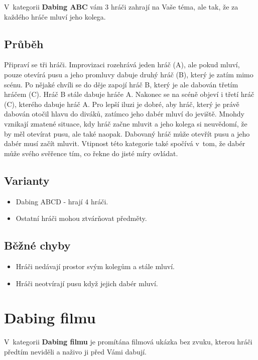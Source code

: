 V~kategorii \textbf{Dabing ABC} vám 3 hráči zahrají na Vaše téma, ale tak, že za každého hráče mluví jeho kolega. 
 
\subsection{Průběh} Připraví se tři hráči. Improvizaci rozehrává jeden hráč (A), ale pokud mluví, pouze otevírá pusu a jeho promluvy dabuje druhý hráč (B), který je zatím mimo scénu. Po nějaké chvíli se do děje zapojí hráč B, který je ale dabován třetím hráčem (C). Hráč B stále dabuje hráče A. Nakonec se na scéně objeví i třetí hráč (C), kterého dabuje hráč A. Pro lepší iluzi je dobré, aby hráč, který je právě dabován otočil hlavu do diváků, zatímco jeho dabér mluví do jeviště. Mnohdy vznikají zmatené situace, kdy hráč začne mluvit a jeho kolega si neuvědomí, že by měl otevírat pusu, ale také naopak. Dabovaný hráč může otevřít pusu a jeho dabér musí začít mluvit. Vtipnost této kategorie také spočívá v~tom, že dabér může svého svěřence tím, co řekne do jisté míry ovládat. 
 
\subsection{ Varianty } \begin{itemize}
\item Dabing ABCD - hrají 4 hráči.
\item Ostatní hráči mohou ztvárňovat předměty.
\end{itemize}
 
\subsection{ Běžné chyby } \begin{itemize}
\item Hráči nedávají prostor svým kolegům a stále mluví.
\item Hráči neotvírají pusu když jejich dabér mluví.
\end{itemize}
 
 
 
 
 
\needspace{5cm} \section{Dabing filmu} \label{dabing filmu}  
 
V~kategorii \textbf{Dabing filmu} je promítána filmová ukázka bez zvuku, kterou hráči předtím neviděli a naživo ji před Vámi dabují. 
 
